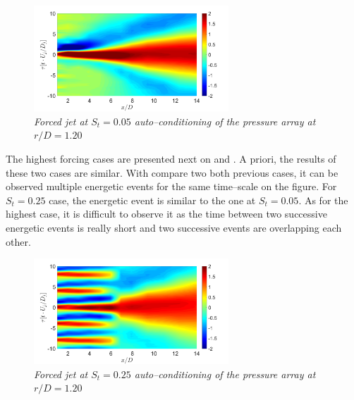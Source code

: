 \begin{figure}
	\centering
	\includegraphics[width=0.65\textwidth]{Figures/conditioning/autoCondSt0p05.png}
	\caption{\textit{Forced jet at $S_t = 0.05$ auto--conditioning of the pressure array at $r/D = 1.20$}}
	\label{fig:autoCondSt0p05}
\end{figure}

The highest forcing cases are presented next on  and .
A priori, the results of these two cases are similar.
With compare two both previous cases, it can be observed multiple energetic events for the same time--scale on the figure.
For $S_t = 0.25$ case, the energetic event is similar to the one at $S_t = 0.05$.
As for the highest case, it is difficult to observe it as the time between two successive energetic events is really short and two successive events are overlapping each other. 

\begin{figure}
	\centering
	\includegraphics[width=0.65\textwidth]{Figures/conditioning/autoCondSt0p25.png}
	\caption{\textit{Forced jet at $S_t = 0.25$ auto--conditioning of the pressure array at $r/D = 1.20$}}
	\label{fig:autoCondSt0p25}
\end{figure}

